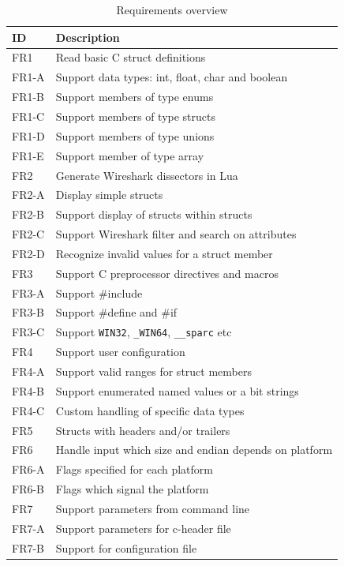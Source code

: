 \begin{table}[H] \small \center
\caption{Requirements overview\label{tab:reqsoverview}}
\begin{tabular}{l l}
	\toprule ID & Description \\ \midrule
	FR1 & Read basic C struct definitions \\
	FR1-A & Support data types: int, float, char and boolean \\
	FR1-B & Support members of type enums \\
	FR1-C & Support members of type structs \\
	FR1-D & Support members of type unions \\
	FR1-E & Support member of type array \\
	\addlinespace
	FR2 & Generate Wireshark dissectors in Lua \\
	FR2-A & Display simple structs \\
	FR2-B & Support display of structs within structs \\
	FR2-C & Support Wireshark filter and search on attributes \\
	FR2-D & Recognize invalid values for a struct member \\
	\addlinespace
	FR3 & Support C preprocessor directives and macros \\
	FR3-A & Support \#include \\
	FR3-B & Support \#define and \#if \\
	FR3-C & Support \verb+WIN32+, \verb+_WIN64+, \verb+__sparc+ etc \\
	\addlinespace
	FR4 & Support user configuration \\
	FR4-A & Support valid ranges for struct members \\
	FR4-B & Support enumerated named values or a bit strings \\
	FR4-C & Custom handling of specific data types \\
	\addlinespace
	FR5 & Structs with headers and/or trailers \\
	\addlinespace
	FR6 & Handle input which size and endian depends on platform \\
	FR6-A & Flags specified for each platform \\
	FR6-B & Flags which signal the platform \\
	\addlinespace
	FR7 & Support parameters from command line \\
	FR7-A & Support parameters for c-header file \\
	FR7-B & Support for configuration file \\

\end{tabular}
\end{table}
